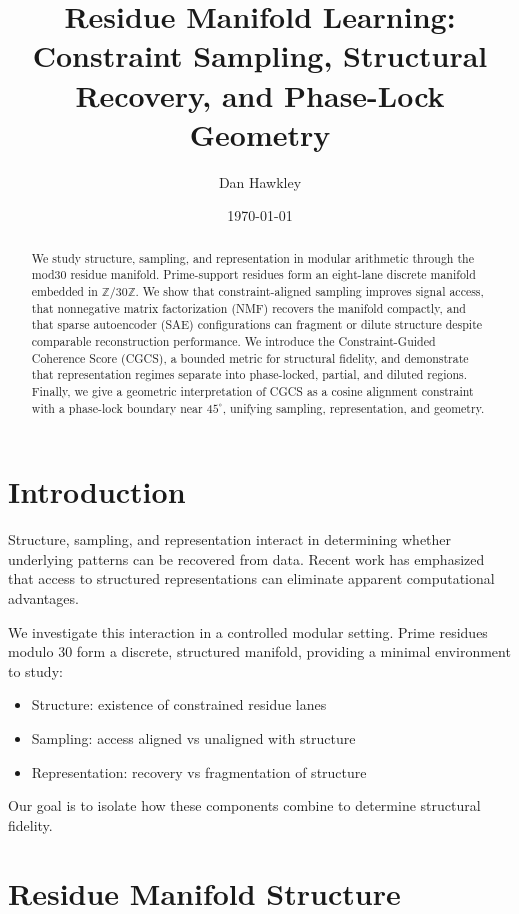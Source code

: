 \documentclass[11pt]{article}
\title{\textbf{Residue Manifold Learning:\\
Constraint Sampling, Structural Recovery, and Phase-Lock Geometry}}
\author{Dan Hawkley}
\affil{\small \url{https://github.com/thinkthoughts/residue-manifold-learning}}
\date{\today}
\begin{document}
\maketitle

\begin{abstract}
We study structure, sampling, and representation in modular arithmetic through the mod30 residue manifold. Prime-support residues form an eight-lane discrete manifold embedded in $\mathbb{Z}/30\mathbb{Z}$. We show that constraint-aligned sampling improves signal access, that nonnegative matrix factorization (NMF) recovers the manifold compactly, and that sparse autoencoder (SAE) configurations can fragment or dilute structure despite comparable reconstruction performance. We introduce the Constraint-Guided Coherence Score (CGCS), a bounded metric for structural fidelity, and demonstrate that representation regimes separate into phase-locked, partial, and diluted regions. Finally, we give a geometric interpretation of CGCS as a cosine alignment constraint with a phase-lock boundary near $45^\circ$, unifying sampling, representation, and geometry.
\end{abstract}

\section{Introduction}

Structure, sampling, and representation interact in determining whether underlying patterns can be recovered from data. Recent work has emphasized that access to structured representations can eliminate apparent computational advantages.

We investigate this interaction in a controlled modular setting. Prime residues modulo 30 form a discrete, structured manifold, providing a minimal environment to study:

\begin{itemize}
\item Structure: existence of constrained residue lanes
\item Sampling: access aligned vs unaligned with structure
\item Representation: recovery vs fragmentation of structure
\end{itemize}

Our goal is to isolate how these components combine to determine structural fidelity.

\section{Residue Manifold Structure}
\end{document}

